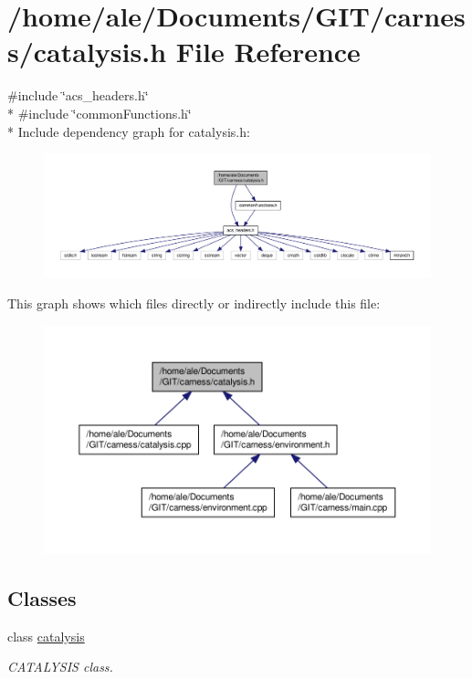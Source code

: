 \hypertarget{a00068}{\section{/home/ale/\-Documents/\-G\-I\-T/carness/catalysis.h File Reference}
\label{a00068}
}
{\ttfamily \#include \char`\"{}acs\-\_\-headers.\-h\char`\"{}}\\*
{\ttfamily \#include \char`\"{}common\-Functions.\-h\char`\"{}}\\*
Include dependency graph for catalysis.\-h\-:\nopagebreak
\begin{figure}[H]
\begin{center}
\leavevmode
\includegraphics[width=350pt]{a00121}
\end{center}
\end{figure}
This graph shows which files directly or indirectly include this file\-:\nopagebreak
\begin{figure}[H]
\begin{center}
\leavevmode
\includegraphics[width=350pt]{a00122}
\end{center}
\end{figure}
\subsection*{Classes}
\begin{DoxyCompactItemize}
\item 
class \hyperlink{a00006}{catalysis}
\begin{DoxyCompactList}\small\item\em C\-A\-T\-A\-L\-Y\-S\-I\-S class. \end{DoxyCompactList}\end{DoxyCompactItemize}
